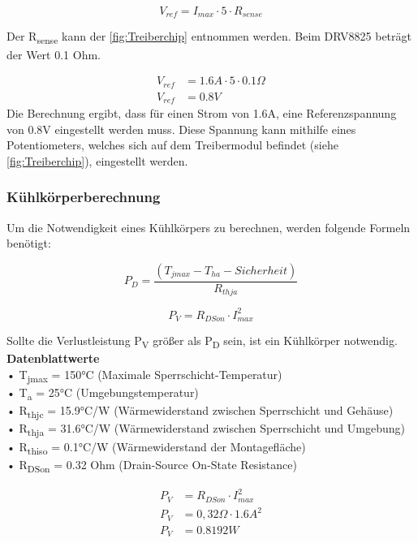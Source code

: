 \begin{equation*}
    V_{ref} = I_{max} \cdot 5 \cdot R_{sense}
\end{equation*}

Der R\textsubscript{sense} kann der \autoref{fig:Treiberchip} entnommen werden.
Beim DRV8825 beträgt der Wert 0.1 Ohm.

\begin{align*}
    V_{ref} &= 1.6A \cdot 5 \cdot 0.1\Omega \\
    V_{ref} &= 0.8V
\end{align*}
Die Berechnung ergibt, dass für einen Strom von 1.6A, eine Referenzspannung von 0.8V eingestellt werden muss.
Diese Spannung kann mithilfe eines Potentiometers, welches sich auf dem Treibermodul befindet (siehe \autoref{fig:Treiberchip}), eingestellt werden.

\newpage
\subsubsection{Kühlkörperberechnung}
Um die Notwendigkeit eines Kühlkörpers zu berechnen, werden folgende Formeln benötigt:

\begin{equation}
    P_D = \frac{(T_{jmax} - T_{ha} - Sicherheit)}{R_{thja}}
\end{equation}

\begin{equation}
    P_V = R_{DSon} \cdot I_{max}^2
\end{equation}

Sollte die Verlustleistung P\textsubscript{V} größer als P\textsubscript{D} sein, ist ein Kühlkörper notwendig. \\

\textbf{Datenblattwerte}\\
• T\textsubscript{jmax} = 150°C (Maximale Sperrschicht-Temperatur)\\
• T\textsubscript{a} = 25°C (Umgebungstemperatur)\\
• R\textsubscript{thjc} = 15.9°C/W (Wärmewiderstand zwischen Sperrschicht und Gehäuse)\\
• R\textsubscript{thja} = 31.6°C/W (Wärmewiderstand zwischen Sperrschicht und Umgebung)\\
• R\textsubscript{thiso} = 0.1°C/W (Wärmewiderstand der Montagefläche)\\
• R\textsubscript{DSon} = 0.32 Ohm (Drain-Source On-State Resistance)

\begin{align*}
    P_V &= R_{DSon} \cdot I_{max}^2 \\
    P_V &= 0,32\Omega \cdot 1.6A^2 \\
    P_V &= 0.8192W
\end{align*}

